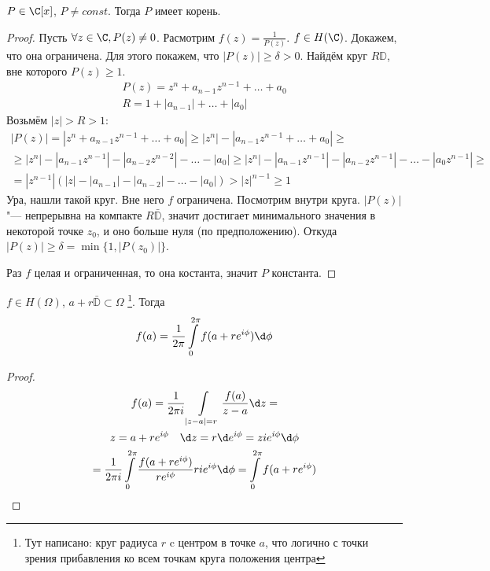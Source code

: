 \begin{theorem}
	$P \in \C[x]$, $P \ne const$.
	Тогда $P$ имеет корень.
\end{theorem}
\begin{proof}
	Пусть $\forall z \in \C, P(z) \ne 0$.
	Расмотрим $f(z) = \frac1{P(z)}$. $f \in H(\C)$.
	Докажем, что она ограничена.
	Для этого покажем, что $|P(z)| \ge \delta > 0$.
	Найдём круг $R\mathbb D$, вне которого $P(z) \ge 1$.
	\begin{gather*}
		P(z) = z^n + a_{n-1} z^{n-1} + \dots + a_0 \\
		R = 1 + |a_{n-1}| + \dots + |a_0|
	\end{gather*}
	Возьмём $|z| > R > 1$:
	\begin{gather*}
		|P(z)| = |z^n + a_{n-1} z^{n-1} + \dots + a_0|
		\ge |z^n| - |a_{n-1} z^{n-1} + \dots + a_0| \ge \\
		\ge |z^n| - |a_{n-1} z^{n-1}| - |a_{n-2} z^{n-2}| - \dots - |a_0|
		\ge |z^n| - |a_{n-1} z^{n-1}| - |a_{n-2} z^{n-1}| - \dots - |a_0 z^{n-1}| \ge \\
		= |z^{n-1}| (|z| - |a_{n-1}| - |a_{n-2}| - \dots - |a_0|) > |z|^{n-1} \ge 1
	\end{gather*}
	Ура, нашли такой круг. Вне него $f$ ограничена.
	Посмотрим внутри круга.
	$|P(z)|$ "--- непрерывна на компакте $R\bar{\mathbb D}$,
	значит достигает минимального значения в некоторой точке $z_0$, и оно больше нуля (по предположению).
	Откуда $|P(z)| \ge \delta = \min\{1, |P(z_0)|\}$.

	Раз $f$ целая и ограниченная, то она костанта, значит $P$ константа.
\end{proof}

\begin{theorem}[О среднем]
	$f \in H(\Omega)$, $a + r\bar{\mathbb D} \subset \Omega$
	\footnote{Тут написано: круг радиуса $r$ c центром в точке $a$, что логично с точки зрения прибавления ко всем точкам круга положения центра}.
	Тогда
	\[ f(a) = \frac1{2\pi} \int\limits_0^{2\pi} f(a + re^{i\phi}) \d \phi \]
\end{theorem}
\begin{proof}
	\begin{gather*}
		f(a)
		= \frac1{2\pi i} \int\limits_{|z - a| = r} \frac{f(a)}{z - a} \d z = \\
		z = a + re^{i\phi} \quad \d z = r \d e^{i\phi} = zie^{i\phi} \d \phi \\
		= \frac1{2\pi i}\int\limits_0^{2\pi} \frac{f(a + re^{i\phi})}{re^{i\phi}} rie^{i\phi} \d \phi
		= \int\limits_0^{2\pi} f(a + re^{i\phi})
	\end{gather*}
\end{proof}

